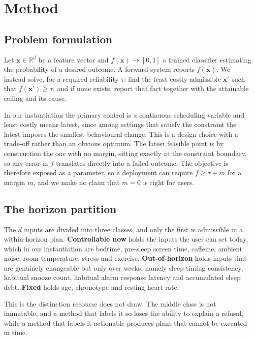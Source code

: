 \documentclass[conference,letterpaper]{IEEEtran}
\begin{document}
\section{Method}
\label{sec:method}

\subsection{Problem formulation}

Let $\mathbf{x} \in \mathbb{R}^d$ be a feature vector and
$f(\mathbf{x}) \rightarrow [0,1]$ a trained classifier estimating the
probability of a desired outcome. A forward system reports $f(\mathbf{x})$. We
instead solve, for a required reliability $\tau$: find the least costly
admissible $\mathbf{x}'$ such that $f(\mathbf{x}') \ge \tau$, and if none
exists, report that fact together with the attainable ceiling and its cause.

In our instantiation the primary control is a continuous scheduling variable and
least costly means latest, since among settings that satisfy the constraint the
latest imposes the smallest behavioural change. This is a design choice with a
trade-off rather than an obvious optimum. The latest feasible point is by
construction the one with no margin, sitting exactly at the constraint boundary,
so any error in $f$ translates directly into a failed outcome. The objective is
therefore exposed as a parameter, so a deployment can require
$f \ge \tau + m$ for a margin $m$, and we make no claim that $m = 0$ is right
for users.

\subsection{The horizon partition}

The $d$ inputs are divided into three classes, and only the first is admissible
in a within-horizon plan. \textbf{Controllable now} holds the inputs the user
can set today, which in our instantiation are bedtime, pre-sleep screen time,
caffeine, ambient noise, room temperature, stress and exercise.
\textbf{Out-of-horizon} holds inputs that are genuinely changeable but only over
weeks, namely sleep-timing consistency, habitual snooze count, habitual alarm
response latency and accumulated sleep debt. \textbf{Fixed} holds age,
chronotype and resting heart rate.

This is the distinction recourse does not draw. The middle class is not
immutable, and a method that labels it so loses the ability to explain a
refusal, while a method that labels it actionable produces plans that cannot be
executed in time.
\end{document}

